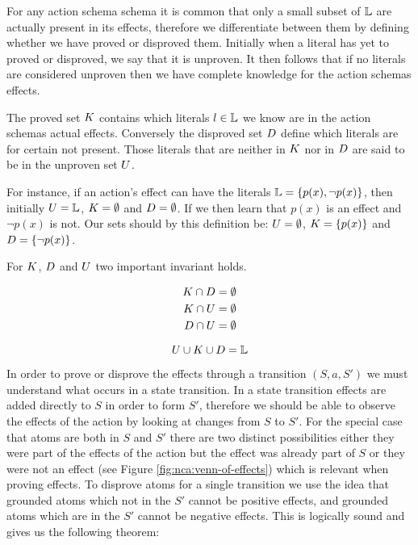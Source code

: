 \documentclass[../Master.tex]{subfiles}
\begin{document}
For any action schema schema it is common that only a small subset of $\mathbb{L}$ are actually present in its effects, 
therefore we differentiate between them by defining whether we have proved or disproved them. 
Initially when a literal has yet to proved or disproved, we say that it is unproven. 
It then follows that if no literals are considered unproven then we have complete knowledge for the action schemas effects.


\begin{definition} 
	The proved set $K$ contains which literals  $l \in \mathbb{L}$ we know are in the action schemas actual effects.
	Conversely the disproved set $D$ define which literals are for certain not present.
	Those literals that are neither in $K$ nor in $D$ are said to be in the unproven set $U$.
	
	For instance, if an action's effect can have the literals $\mathbb{L} = \{p(x), \neg p(x)\}$, 
	then initially $U = \mathbb{L}$, $K = \emptyset$ and $D = \emptyset$. 
	If we then learn that $p(x)$ is an effect and $\neg p(x)$ is not. 
	Our sets should by this definition be: $U = \emptyset$, $K = \{p(x)\}$ and $D = \{\neg p(x)\}$. 
	
\end{definition}

For $K$, $D$ and $U$ two important invariant holds.

\begin{invariant}\label{inv:nca:mutual-ex}
	\begin{equation*}
		\begin{split}
		K \cap D & = \emptyset  \\ 
		K \cap U &= \emptyset \\
		D \cap U &= \emptyset
		\end{split}
	\end{equation*}
\end{invariant}

\begin{invariant}[Completeness]
	\begin{equation*}
		U \cup K \cup D = \mathbb{L}
	\end{equation*}
\end{invariant}

In order to prove or disprove the effects through a transition $(S,a,S')$ we must understand what occurs in a state transition.
In a state transition effects are added directly to $S$ in order to form $S'$, therefore we should be able to observe the effects of the action by looking at changes from $S$ to $S'$.  For the special case that atoms are both in $S$ and $S'$ there are two distinct possibilities either they were part of the effects of the action but the effect was already part of $S$ or they were not an effect (see Figure \ref{fig:nca:venn-of-effects}) which is relevant when proving effects. 
To disprove atoms for a single transition we use the idea that grounded atoms which not in the $S'$ cannot be positive effects, and grounded atoms which are in the $S'$ cannot be negative effects. 
This is logically sound and gives us the following theorem:
\end{document}
